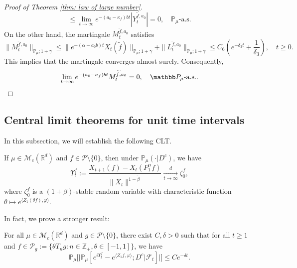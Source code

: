 \documentclass[EJP]{ejpecp} %
\begin{document}
\begin{proof}[Proof of Theorem \ref{thm: law of large number}]
\[    \leq  \lim_{t\rightarrow \infty}e^{-(a_0 - \kappa_f)bt}|Y_t^{\widetilde{f},a_0}|=0,
    \quad \mathbb P_\mu\text{-a.s.}
\]
	On the other hand, the martingale $M_t^{\widetilde{f},a_0}$ satisfies
\[
    \|M_t^{\widetilde{f},a_0}\|_{\mathbb{P}_{\mu};1+\gamma}
    \leq \|e^{-(\alpha-a_0 b)t}X_t(\widetilde{f})\|_{\mathbb{P}_{\mu};1+\gamma}+\|L_t^{\widetilde{f},a_0}\|_{\mathbb{P}_{\mu};1+\gamma}
    \leq C_6(e^{-\delta_3 t}+\frac{1}{\delta_3}),
    \quad t\geq 0.
\]
	This implies that the martingale converges almost surely.
	Consequently,
\[
    \lim_{t\rightarrow\infty} e^{-(a_0-\kappa_f)bt}M_t^{\widetilde{f},a_0}
    = 0,
    \quad \mathbb P_\mu\text{-a.s.}.
    \qedhere
\]
\end{proof}

\subsection{Central limit theorems for unit time intervals}
\label{sec:critical}
	In this subsection, we will establish the following CLT.
\begin{theorem}
\label{lem:PR:LC}
	If  $\mu \in \mathcal M_c(\mathbb R^d)$ and $f\in \mathcal{P}\setminus \{0\}$, then  under $\mathbb{P}_{\mu}(\cdot | D ^c)$, we have
\begin{equation}
    \label{eq:PR:LC:1}
    \Upsilon^f_t
    := \frac{X_{t+1} (f) - X_t(P_1^\alpha f)}{\| X_t\|^{1-\tilde \beta}}
    \xrightarrow[t\to \infty]{d}\zeta^f_0,
\end{equation}
	where $\zeta^f_0$ is a $(1+\beta)$-stable random variable with characteristic function $\theta\mapsto e^{\langle Z_1(\theta f), \varphi\rangle}$.
\end{theorem}

	In fact, we prove a stronger result:

\begin{proposition}
\label{thm:Key}
	For all $\mu \in \mathcal M_c(\mathbb R^d)$ and $g \in \mathcal P \setminus \{0\}$, there exist $C,\delta>0$ such that for all $t\geq 1$ and $f \in \mathcal P_g:= \{\theta T_ng:n \in \mathbb Z_+, \theta \in [-1,1]\}$, we have
\[
    \mathbb P_\mu
    \Big[  \big|\mathbb P_\mu [e^{i\Upsilon^f_t} - e^{\langle Z_1f, \varphi\rangle}; D^c | \mathscr F_t ] \big |\Big]
    \leq C e^{- \delta t}.
\]
\end{proposition}
\end{document}
